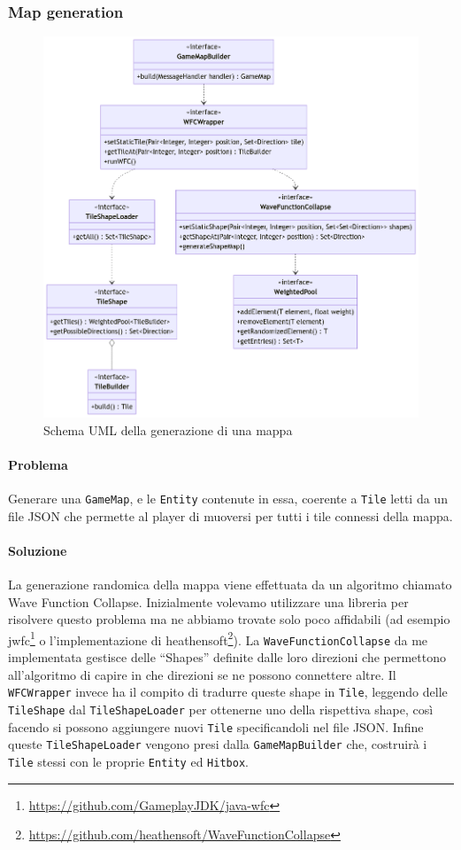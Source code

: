 \documentclass[a4paper,12pt]{report}
\begin{document}
\subsubsection{Map generation}
\begin{figure}[H]
\centering{}
\includegraphics[width=1.0\columnwidth]{images/uml-mapgen.png}
\caption{Schema UML della generazione di una mappa}
\label{img:uml-map-generation}
\end{figure}
\paragraph{Problema} Generare una \texttt{GameMap}, e le \texttt{Entity} contenute in essa, coerente a \texttt{Tile} letti da un file JSON che permette al player di muoversi per tutti i tile connessi della mappa.
\paragraph{Soluzione} La generazione randomica della mappa viene effettuata da un algoritmo chiamato Wave Function Collapse.
%
Inizialmente volevamo utilizzare una libreria per risolvere questo problema ma ne abbiamo trovate solo poco affidabili (ad esempio jwfc\footnote{\url{https://github.com/GameplayJDK/java-wfc}} o l'implementazione di heathensoft\footnote{\url{https://github.com/heathensoft/WaveFunctionCollapse}}).
%
La \texttt{WaveFunctionCollapse} da me implementata gestisce delle “Shapes” definite dalle loro direzioni che permettono all’algoritmo di capire in che direzioni se ne possono connettere altre. 
%
Il \texttt{WFCWrapper} invece ha il compito di tradurre queste shape in \texttt{Tile}, leggendo delle \texttt{TileShape} dal \texttt{TileShapeLoader} per ottenerne uno della rispettiva shape, così facendo si possono aggiungere nuovi \texttt{Tile} specificandoli nel file JSON. 
%
Infine queste \texttt{TileShapeLoader} vengono presi dalla \texttt{GameMapBuilder} che, costruirà i \texttt{Tile} stessi con le proprie \texttt{Entity} ed \texttt{Hitbox}.
\end{document}
